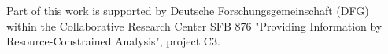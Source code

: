 Part of this work is supported by Deutsche Forschungsgemeinschaft (DFG) within the Collaborative Research Center SFB 876
"Providing Information by Resource-Constrained Analysis", project C3. 
